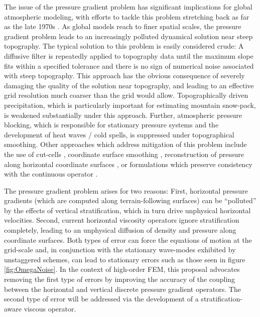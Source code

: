 \documentclass[11pt]{article}
\begin{document}
The issue of the pressure gradient problem has significant implications for global atmospheric modeling, with efforts to tackle this problem stretching back as far as the late 1970s \cite{ZIJ1977BzPdA, DTMZIJ1986MAP}.  As global models reach to finer spatial scales, the pressure gradient problem leads to an increasingly polluted dynamical solution near steep topography.  The typical solution to this problem is easily considered crude:  A diffusive filter is repeatedly applied to topography data until the maximum slope fits within a specified tolerance and there is no sign of numerical noise associated with steep topography.  This approach has the obvious consequence of severely damaging the quality of the solution near topography, and leading to an effective grid resolution much coarser than the grid would allow.  Topographically driven precipitation, which is particularly important for estimating mountain snow-pack, is weakened substantially under this approach.  Further, atmospheric pressure blocking, which is responsible for stationary pressure systems and the development of heat waves / cold spells, is suppressed under topographical smoothing.  Other approaches which address mitigation of this problem include the use of cut-cells \cite{JSSHPAD2013GMDD}, coordinate surface smoothing \cite{JBK2011MWR}, reconstruction of pressure along horizontal coordinate surfaces \cite{GZ2012MWR}, or formulations which preserve consistency with the continuous operator \cite{SJL1997QJRMS}.

The pressure gradient problem arises for two reasons:  First, horizontal pressure gradients (which are computed along terrain-following surfaces) can be ``polluted'' by the effects of vertical stratification, which in turn drive unphysical horizontal velocities.  Second, current horizontal viscosity operators \cite{dennis2011cam} ignore stratification completely, leading to an unphysical diffusion of density and pressure along coordinate surfaces.  Both types of error can force the equations of motion at the grid-scale and, in conjunction with the stationary wave-modes exhibited by unstaggered schemes, can lead to stationary errors such as those seen in figure \ref{fig:OmegaNoise}.  In the context of high-order FEM, this proposal advocates removing the first type of errors by improving the accuracy of the coupling between the horizontal and vertical discrete pressure gradient operators.  The second type of error will be addressed via the development of a stratification-aware viscous operator.


\end{document}
